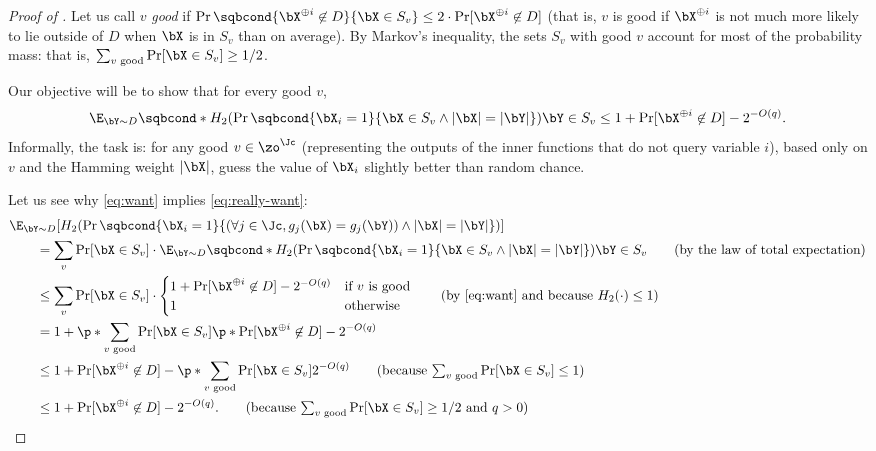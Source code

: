 \begin{proof}[Proof of ]
Let us call $v$ \emph{good} if $\Pr\sqbcond{\bX^{\oplus i} \not\in D}{\bX \in S_v} \leq 2\cdot \Pr[\bX^{\oplus i} \not\in D]$ (that is, $v$ is good if $\bX^{\oplus i}$ is not much more likely to lie outside of $D$ when $\bX$ is in $S_v$ than on average).
By Markov's inequality, the sets $S_v$ with good $v$ account for most of the probability mass: that is, $\sum_{\text{$v$ good}} \Pr[\bX \in S_v] \geq 1/2$.

Our objective will be to show that for every good $v$,
\begin{equation}
\label{eq:want}
\E_{\bY \sim D}\sqbcond*{H_2(\Pr\sqbcond{\bX_i=1}{\bX \in S_v \wedge|\bX|=|\bY|})}{\bY \in S_v}
\leq 1 + \Pr[\bX^{\oplus i} \not \in D] - 2^{-O(q)}.
\end{equation}
Informally, the task is: for any good $v \in \zo^\Jc$ (representing the outputs of the inner functions that do not query variable $i$), based only on $v$ and the Hamming weight $|\bX|$, guess the value of $\bX_i$ slightly better than random chance.

Let us see why \eqref{eq:want} implies \eqref{eq:really-want}:
\begin{align*}
    &\E_{\bY \sim D}[H_2(\Pr\sqbcond{\bX_i=1}{(\forall j \in \Jc, g_j(\bX)=g_j(\bY))\wedge|\bX|=|\bY|})]\\
    &\qquad= \sum_v \Pr[\bX \in S_v] \cdot \E_{\bY \sim D}\sqbcond*{H_2(\Pr\sqbcond{\bX_i=1}{\bX \in S_v \wedge|\bX|=|\bY|})}{\bY \in S_v}\tag{by the law of total expectation}\\
    &\qquad\leq \sum_v \Pr[\bX \in S_v] \cdot
    \begin{cases}
    1 + \Pr[\bX^{\oplus i} \not \in D] - 2^{-O(q)} & \text{if $v$ is good}\\
    1 & \text{otherwise}
    \end{cases}\tag{by \eqref{eq:want} and because $H_2(\cdot) \leq 1$}\\
    &\qquad= 1 + \p*{\sum_\text{$v$ good} \Pr[\bX \in S_v]} \p*{\Pr[\bX^{\oplus i} \not \in D] - 2^{-O(q)}}\\
    &\qquad\leq 1 + \Pr[\bX^{\oplus i} \not \in D] - \p*{\sum_\text{$v$ good} \Pr[\bX \in S_v]}2^{-O(q)}\tag{because $\sum_\text{$v$ good} \Pr[\bX \in S_v] \leq 1$}\\
    &\qquad\leq 1 + \Pr[\bX^{\oplus i} \not \in D] - 2^{-O(q)}.\tag{because $\sum_\text{$v$ good} \Pr[\bX \in S_v] \geq 1/2$ and $q > 0$}
\end{align*}


\end{proof}
